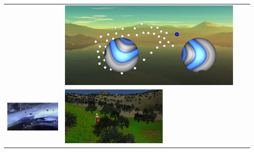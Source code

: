 \documentclass{beamer}
\begin{document}
\begin{frame}[fragile]{\CurrentSection}
\begin{block}{\CurrentSubSection}
\begin{table}[h!]
\begin{tabular}{ m{2cm} m{2cm} m{2cm} m{2cm} }
\begin{minipage}{.23\textwidth}
    \end{minipage}
    &
    \begin{minipage}{.23\textwidth}
      \includegraphics[width=\linewidth]{Figures/d}
    \end{minipage}
    \\ 
        \begin{minipage}{.23\textwidth}
      \includegraphics[width=\linewidth]{Figures/e}
    \end{minipage}
    &
        \begin{minipage}{.23\textwidth}
      \includegraphics[width=\linewidth]{Figures/f}

\end{minipage}
\end{tabular}
\end{table}
\end{block}
\end{frame}
\end{document}
